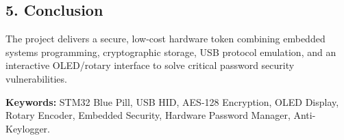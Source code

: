 \documentclass[12pt,a4paper]{article}
\begin{document}
\vspace{0.3cm}

\subsection*{5. Conclusion}
The project delivers a secure, low-cost hardware token combining embedded systems programming, cryptographic storage, USB protocol emulation, and an interactive OLED/rotary interface to solve critical password security vulnerabilities.

\vspace{0.5cm}

\noindent
\textbf{Keywords:} STM32 Blue Pill, USB HID, AES-128 Encryption, OLED Display, Rotary Encoder, Embedded Security, Hardware Password Manager, Anti-Keylogger.
\end{document}
